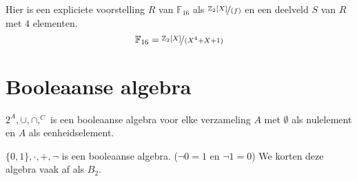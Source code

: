 \documentclass[main.tex]{subfiles}
\begin{document}
\begin{vb}
  Hier is een expliciete voorstelling $R$ van $\mathbb{F}_{16}$ als $\nicefrac{\mathbb{Z}_{2}[X]}{(f)}$ en een deelveld $S$ van $R$ met $4$ elementen.
  \[ \mathbb{F}_{16} = \nicefrac{\mathbb{Z}_{2}[X]}{(X^{4}+X+1)} \]
\end{vb}




\section{Booleaanse algebra}
\label{sec:booleaanse-algebra}

\begin{vb}
  $2^{A},\cup,\cap,^{C}$ is een booleaanse algebra voor elke verzameling $A$ met $\emptyset$ als nulelement en $A$ als eenheidselement.
\end{vb}

\begin{vb}
  $\{0,1\},\cdot,+,\neg$ is een booleaanse algebra. ($\neg 0 = 1$ en $\neg 1 = 0$)
  We korten deze algebra vaak af als $B_{2}$.
\end{vb}    
\end{document}
